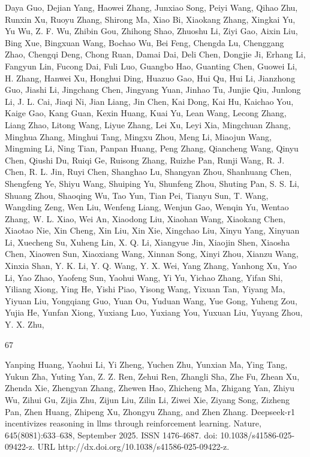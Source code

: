 \documentclass[
  10
]{article}
\begin{document}
Daya Guo, Dejian Yang, Haowei Zhang, Junxiao Song, Peiyi Wang, Qihao
Zhu, Runxin Xu, Ruoyu Zhang, Shirong Ma, Xiao Bi, Xiaokang Zhang,
Xingkai Yu, Yu Wu, Z. F. Wu, Zhibin Gou, Zhihong Shao, Zhuoshu Li, Ziyi
Gao, Aixin Liu, Bing Xue, Bingxuan Wang, Bochao Wu, Bei Feng, Chengda
Lu, Chenggang Zhao, Chengqi Deng, Chong Ruan, Damai Dai, Deli Chen,
Dongjie Ji, Erhang Li, Fangyun Lin, Fucong Dai, Fuli Luo, Guangbo Hao,
Guanting Chen, Guowei Li, H. Zhang, Hanwei Xu, Honghui Ding, Huazuo Gao,
Hui Qu, Hui Li, Jianzhong Guo, Jiashi Li, Jingchang Chen, Jingyang Yuan,
Jinhao Tu, Junjie Qiu, Junlong Li, J. L. Cai, Jiaqi Ni, Jian Liang, Jin
Chen, Kai Dong, Kai Hu, Kaichao You, Kaige Gao, Kang Guan, Kexin Huang,
Kuai Yu, Lean Wang, Lecong Zhang, Liang Zhao, Litong Wang, Liyue Zhang,
Lei Xu, Leyi Xia, Mingchuan Zhang, Minghua Zhang, Minghui Tang, Mingxu
Zhou, Meng Li, Miaojun Wang, Mingming Li, Ning Tian, Panpan Huang, Peng
Zhang, Qiancheng Wang, Qinyu Chen, Qiushi Du, Ruiqi Ge, Ruisong Zhang,
Ruizhe Pan, Runji Wang, R. J. Chen, R. L. Jin, Ruyi Chen, Shanghao Lu,
Shangyan Zhou, Shanhuang Chen, Shengfeng Ye, Shiyu Wang, Shuiping Yu,
Shunfeng Zhou, Shuting Pan, S. S. Li, Shuang Zhou, Shaoqing Wu, Tao Yun,
Tian Pei, Tianyu Sun, T. Wang, Wangding Zeng, Wen Liu, Wenfeng Liang,
Wenjun Gao, Wenqin Yu, Wentao Zhang, W. L. Xiao, Wei An, Xiaodong Liu,
Xiaohan Wang, Xiaokang Chen, Xiaotao Nie, Xin Cheng, Xin Liu, Xin Xie,
Xingchao Liu, Xinyu Yang, Xinyuan Li, Xuecheng Su, Xuheng Lin, X. Q. Li,
Xiangyue Jin, Xiaojin Shen, Xiaosha Chen, Xiaowen Sun, Xiaoxiang Wang,
Xinnan Song, Xinyi Zhou, Xianzu Wang, Xinxia Shan, Y. K. Li, Y. Q. Wang,
Y. X. Wei, Yang Zhang, Yanhong Xu, Yao Li, Yao Zhao, Yaofeng Sun, Yaohui
Wang, Yi Yu, Yichao Zhang, Yifan Shi, Yiliang Xiong, Ying He, Yishi
Piao, Yisong Wang, Yixuan Tan, Yiyang Ma, Yiyuan Liu, Yongqiang Guo,
Yuan Ou, Yuduan Wang, Yue Gong, Yuheng Zou, Yujia He, Yunfan Xiong,
Yuxiang Luo, Yuxiang You, Yuxuan Liu, Yuyang Zhou, Y. X. Zhu,

67

Yanping Huang, Yaohui Li, Yi Zheng, Yuchen Zhu, Yunxian Ma, Ying Tang,
Yukun Zha, Yuting Yan, Z. Z. Ren, Zehui Ren, Zhangli Sha, Zhe Fu, Zhean
Xu, Zhenda Xie, Zhengyan Zhang, Zhewen Hao, Zhicheng Ma, Zhigang Yan,
Zhiyu Wu, Zihui Gu, Zijia Zhu, Zijun Liu, Zilin Li, Ziwei Xie, Ziyang
Song, Zizheng Pan, Zhen Huang, Zhipeng Xu, Zhongyu Zhang, and Zhen
Zhang. Deepseek-r1 incentivizes reasoning in llms through reinforcement
learning. Nature, 645(8081):633--638, September 2025. ISSN 1476-4687.
doi: 10.1038/s41586-025-09422-z. URL
http://dx.doi.org/10.1038/s41586-025-09422-z.
\end{document}
